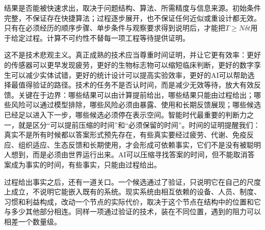 结果是否能被快速求出，取决于问题结构、算法、所需精度与信息来源。初始条件完整，不保证存在快捷算法；过程逐步展开，也不保证任何近似或重设计都无效。只有在必须经历的顺序步骤、单步条件与观察要求得到说明后，才能把$T\geq N\delta t$用于给定过程。计算不可约性不替每一项工程等待提供证明。

这不是技术悲观主义。真正成熟的技术应当尊重时间证明，并让它更有效率：更好的传感器可以更早发现疲劳，更好的生物标志物可以缩短临床判断，更好的数字孪生可以减少实体试错，更好的统计设计可以提高实验效率，更好的AI可以帮助选择最值得验证的路径。技术的任务不是否认时间，而是减少无效等待，放大有效反馈。关键在于边界：哪些结果可以由计算提前给出，哪些结果只能由过程给出；哪些风险可以通过模型排除，哪些风险必须由暴露、使用和长期反馈展现；哪些候选已经足以进入下一步，哪些候选必须停在表示空间。智能时代最重要的判断力之一，就是区分“可以提前压缩的时间”和“必须保留的时间”。时间的证明提醒我们：真实不是所有时候都以答案形式预先存在，有些真实要经过疲劳、代谢、免疫反应、组织适应、生态反馈和长期使用，才会形成可依赖事实，它们不是没有被聪明人想到，而是必须由世界运行出来。AI可以压缩寻找答案的时间，但不能取消答案成为事实的时间，有些事实，只能由过程给出。

过程给出事实之后，还有一道关口。一个候选通过了验证，只说明它在自己的尺度上成立，不说明它能嵌入既有的系统。现实系统由相互依赖的设备、人员、制度、习惯和利益构成，改动一个节点的实际代价，取决于这个节点在结构中的位置和它与多少其他部分相连。同样一项通过验证的技术，装在不同位置，遇到的阻力可以相差一个数量级。
